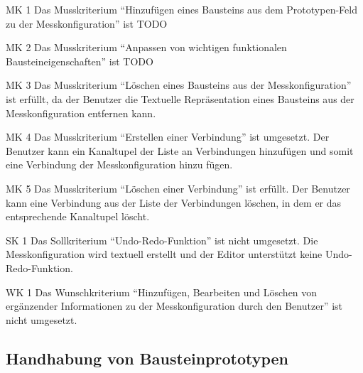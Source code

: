 \documentclass[parskip=full]{scrartcl}
\begin{document}
\begin{description}
\item{MK 1} Das Musskriterium "`Hinzufügen eines Bausteins aus dem Prototypen-Feld zu der Messkonfiguration"' ist TODO
\item{MK 2} Das Musskriterium "`Anpassen von wichtigen funktionalen Bausteineigenschaften"' ist TODO
\item{MK 3} Das Musskriterium "`Löschen eines Bausteins aus der Messkonfiguration"' ist erfüllt, da der Benutzer die Textuelle Repräsentation eines Bausteins aus der Messkonfiguration entfernen kann.
\item{MK 4} Das Musskriterium "`Erstellen einer Verbindung"' ist umgesetzt. Der Benutzer kann ein Kanaltupel der Liste an Verbindungen hinzufügen und somit eine Verbindung der Messkonfiguration hinzu fügen. 
\item{MK 5} Das Musskriterium "`Löschen einer Verbindung"' ist erfüllt. Der Benutzer kann eine Verbindung aus der Liste der Verbindungen löschen, in dem er das entsprechende Kanaltupel löscht.
\item{SK 1} Das Sollkriterium "`Undo-Redo-Funktion"' ist nicht umgesetzt. Die Messkonfiguration wird textuell erstellt und der Editor unterstützt keine Undo-Redo-Funktion. 
\item{WK 1} Das Wunschkriterium "`Hinzufügen, Bearbeiten und Löschen von ergänzender Informationen zu der Messkonfiguration durch den Benutzer"' ist nicht umgesetzt.
\end{description}
\subsection{Handhabung von Bausteinprototypen}
\end{document}
